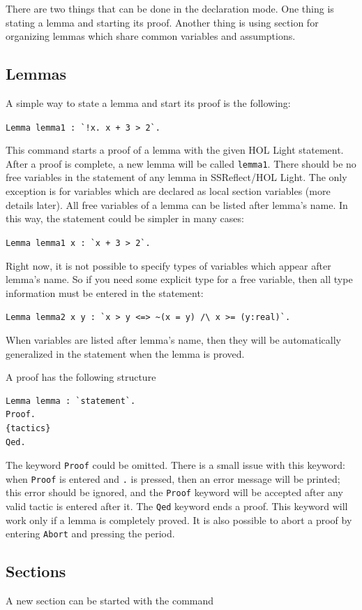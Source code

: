 \documentclass[a4paper]{article}
\begin{document}
There are two things that can be done in the declaration mode. One thing is stating a lemma and starting its proof. Another thing is using section for organizing lemmas which share common variables and assumptions.

\subsection{Lemmas}
A simple way to state a lemma and start its proof is the following:

\verb|Lemma lemma1 : `!x. x + 3 > 2`.|

This command starts a proof of a lemma with the given HOL Light statement. After a proof is complete, a new lemma will be called \verb|lemma1|. There should be no free variables in the statement of any lemma in SSReflect/HOL Light. The only exception is for variables which are declared as local section variables (more details later). All free variables of a lemma can be listed after lemma's name. In this way, the statement could be simpler in many cases:

\verb|Lemma lemma1 x : `x + 3 > 2`.|

Right now, it is not possible to specify types of variables which appear after lemma's name. So if you need some explicit type for a free variable, then all type information must be entered in the statement:

\verb|Lemma lemma2 x y : `x > y <=> ~(x = y) /\ x >= (y:real)`.|

When variables are listed after lemma's name, then they will be automatically generalized in the statement when the lemma is proved.

A proof has the following structure

\begin{verbatim}
Lemma lemma : `statement`.
Proof.
{tactics}
Qed.
\end{verbatim}

The keyword \verb|Proof| could be omitted. There is a small issue with this keyword: when \verb|Proof| is entered and \verb|.| is pressed, then an error message will be printed; this error should be ignored, and the \verb|Proof| keyword will be accepted after any valid tactic is entered after it. The \verb|Qed| keyword ends a proof. This keyword will work only if a lemma is completely proved. It is also possible to abort a proof by entering \verb|Abort| and pressing the period.


\subsection{Sections}
A new section can be started with the command
\end{document}

